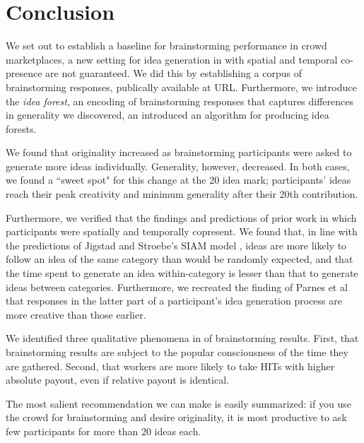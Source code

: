 \section{Conclusion}

We set out to establish a baseline for brainstorming performance in crowd marketplaces, a new setting for idea generation in with spatial and temporal co-presence are not guaranteed. We did this by establishing a corpus of brainstorming responses, publically available at URL. Furthermore, we introduce the \emph{idea forest}, an encoding of brainstorming responses that captures differences in generality we discovered, an introduced an algorithm for producing idea forests.

We found that originality increased as brainstorming participants were asked to generate more ideas individually. Generality, however, decreased. In both cases, we found a ``sweet spot" for this change at the 20 idea mark; participants' ideas reach their peak creativity and minimum generality after their 20th contribution.

Furthermore, we verified that the findings and predictions of prior work in which participants were spatially and temporally copresent. We found that, in line with the predictions of Jigstad and Stroebe's SIAM model \cite{nijstad_how_2006}, ideas are more likely to follow an idea of the same category than would be randomly expected, and that the time spent to generate an idea within-category is lesser than that to generate ideas between categories. Furthermore, we recreated the finding of Parnes et al \cite{parnes_effects_1961} that responses in the latter part of a participant's idea generation process are more creative than those earlier.

We identified three qualitative phenomena in of brainstorming results. First, that brainstorming results are subject to the popular consciousness of the time they are gathered. Second, that workers are more likely to take HITs with higher absolute payout, even if relative payout is identical.

The most salient recommendation we can make is easily summarized: if you use the crowd for brainstorming and desire originality, it is most productive to ask few participants for more than 20 ideas each.